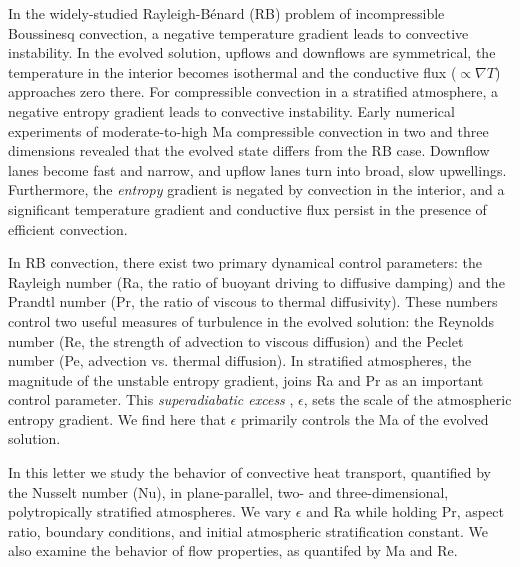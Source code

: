 \documentclass[aps, prl, twocolumn, nofootinbib, groupedaddress, amsfonts, amssymb, amsmath]{revtex4-1}
\newcommand{\grad}{\ensuremath{\nabla}}
\newcommand{\RB}{Rayleigh-B\'{e}nard }
\begin{document}
In the widely-studied \RB (RB) problem of incompressible Boussinesq convection, 
a negative temperature gradient leads to convective instability.
In the evolved solution, upflows and downflows are symmetrical, the
temperature in the interior becomes isothermal and
the conductive flux ($\propto \grad T$) approaches 
zero there. 
For compressible convection in a stratified atmosphere, a
negative entropy gradient leads to convective instability.
Early numerical experiments of moderate-to-high Ma compressible convection
in two \cite{graham1975, chan&all1982,
hurlburt&all1984, cattaneo&all1990} and three 
\cite{cattaneo&all1991, brummell&all1996} dimensions
revealed that the evolved state differs from the RB case.
Downflow lanes
become fast and narrow, and upflow lanes turn into broad, slow upwellings.
Furthermore, the \emph{entropy} gradient is negated by convection in the interior, and
a significant temperature gradient and conductive flux persist in the presence of
efficient convection.

In RB convection, there exist two primary dynamical control parameters: 
the Rayleigh number (Ra, the ratio of
buoyant driving to diffusive damping) and the Prandtl number 
(Pr, the ratio of viscous to thermal
diffusivity). These numbers control two useful
measures of turbulence in the evolved solution:
the Reynolds
number (Re, the strength of advection to viscous diffusion)
and the Peclet number (Pe, advection vs. thermal diffusion).  
In stratified atmospheres, the magnitude of the unstable entropy gradient, 
joins Ra and Pr as an important control parameter.  This 
\emph{superadiabatic excess} \cite{graham1975}, $\epsilon$,
sets the scale of the atmospheric entropy gradient.
We find here that $\epsilon$ primarily controls the Ma of the evolved solution.

In this letter we study the behavior of convective heat transport, 
quantified by the Nusselt number (Nu), in plane-parallel, 
two- and three-dimensional, polytropically stratified atmospheres.  
We vary $\epsilon$ and Ra while holding Pr, aspect ratio, boundary conditions,
and initial atmospheric stratification
constant.  We also examine the behavior of flow properties, as quantifed by Ma and Re.
\end{document}
